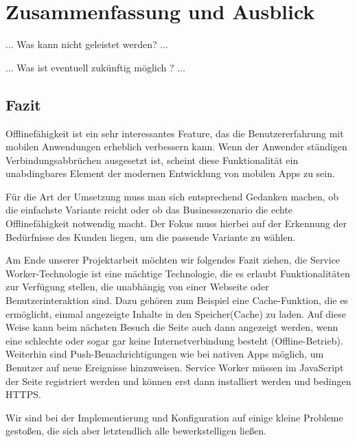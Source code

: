 \chapter{Zusammenfassung und Ausblick}

... Was kann nicht geleistet werden? ...

... Was ist eventuell zukünftig möglich ? ...

\section{Fazit}

Offlinefähigkeit ist ein sehr interessantes Feature, das die Benutzererfahrung mit mobilen Anwendungen erheblich verbessern kann. Wenn der Anwender ständigen Verbindungsabbrüchen ausgesetzt ist, scheint diese Funktionalität ein unabdingbares Element der modernen Entwicklung von mobilen Apps zu sein.

Für die Art der Umsetzung muss man sich entsprechend Gedanken machen, ob die einfachste Variante reicht oder ob das Businessszenario die echte Offlinefähigkeit notwendig macht. Der Fokus muss hierbei auf der Erkennung der Bedürfnisse des Kunden liegen, um die passende Variante zu wählen.

Am Ende unserer Projektarbeit möchten wir folgendes Fazit ziehen, die Service Worker-Technologie ist eine mächtige Technologie, die es erlaubt Funktionalitäten zur Verfügung stellen, die unabhängig von einer Webseite oder Benutzerinteraktion sind. Dazu gehören zum Beispiel eine Cache-Funktion, die es ermöglicht, einmal angezeigte Inhalte in den Speicher(Cache) zu laden. Auf diese Weise kann beim nächsten Besuch die Seite auch dann angezeigt werden, wenn eine schlechte oder sogar gar keine Internetverbindung besteht (Offline-Betrieb). \\
Weiterhin sind Push-Benachrichtigungen wie bei nativen Apps möglich, um Benutzer auf neue Ereignisse hinzuweisen. Service Worker müssen im JavaScript der Seite registriert werden und können erst dann installiert werden und bedingen HTTPS. 

Wir sind bei der Implementierung und Konfiguration auf einige kleine Probleme gestoßen, die sich aber letztendlich alle bewerkstelligen ließen.  
